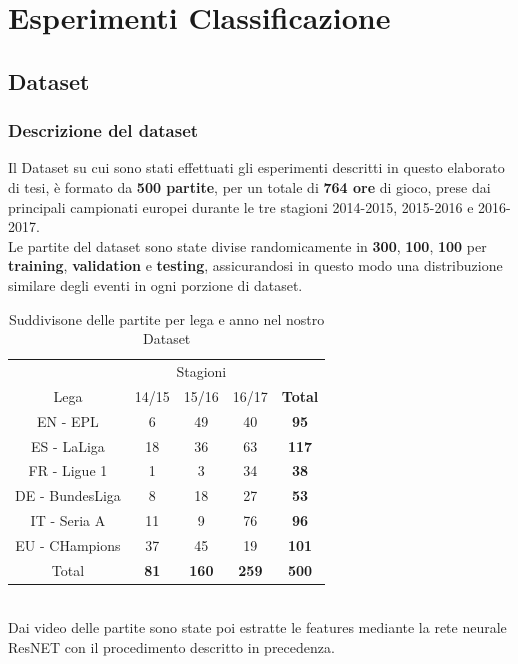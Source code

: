 \chapter{Esperimenti Classificazione}\label{ch:chapter2}
\section{Dataset}
\subsection{Descrizione del dataset}
Il Dataset su cui sono stati effettuati gli esperimenti descritti in questo elaborato di tesi, è formato da \textbf{500 partite}, per un totale di \textbf{764 ore} di gioco, prese dai principali campionati europei durante le tre stagioni 2014-2015, 2015-2016 e 2016-2017.
\\Le partite del dataset sono state divise randomicamente in \textbf{300}, \textbf{100}, \textbf{100} per \textbf{training}, \textbf{validation} e \textbf{testing}, assicurandosi in questo modo una distribuzione similare degli eventi in ogni porzione di dataset.
\begin{table}[ht]
\caption{Suddivisone delle partite per lega e anno nel nostro Dataset}
\centering
\begin{tabular}{c| | c|c|c | | c}
\multicolumn{1}{c}{}&\multicolumn{3}{c}{Stagioni}& \\
Lega & 14/15 & 15/16 & 16/17 & \textbf{Total} \\
\hline
EN - EPL & 6 & 49 & 40 & \textbf{95} \\
ES - LaLiga & 18 & 36 & 63 & \textbf{117} \\
FR - Ligue 1 & 1 &  3 & 34 & \textbf{38} \\
DE - BundesLiga & 8 & 18 & 27 & \textbf{53} \\
IT - Seria A & 11 & 9 & 76 & \textbf{96} \\
EU - CHampions & 37 & 45 & 19 & \textbf{101} \\
\hline
Total & \textbf{81} & \textbf{160} & \textbf{259} & \textbf{500} \\ [1ex]

\end{tabular}
\label{table: Dataset}
\end{table}
\\Dai video delle partite sono state poi estratte le features mediante la rete neurale ResNET con il procedimento descritto in precedenza.
